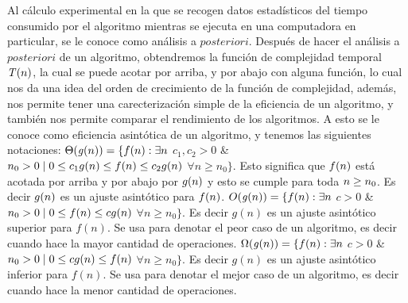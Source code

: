 \documentclass[12pt,twoside]{article}
\begin{document}
\newline
\newline
Al c\'alculo experimental en la que se recogen datos estad\'isticos del tiempo consumido por el algoritmo mientras se ejecuta en una computadora en particular, se le conoce como an\'alisis a $\mathit{posteriori}$.
\newline
\newline
Despu\'es de hacer el an\'alisis a $\mathit{posteriori}$ de un algoritmo, obtendremos la funci\'on de complejidad temporal $\mathit{T}(\mathnormal{n})$, la cual se puede acotar por arriba, y por abajo con alguna funci\'on, lo cual nos da una idea del orden de crecimiento de la funci\'on de complejidad, adem\'as, nos permite tener una carecterizaci\'on simple de la eficiencia de un algoritmo, y tambi\'en nos permite comparar el rendimiento de los algoritmos. A esto se le conoce como eficiencia asint\'otica de un algoritmo, y tenemos las siguientes notaciones:
\newline
$\Theta(\mathit{g}(\mathnormal{n})) = \{ \mathnormal{f}(\mathnormal{n}) : \exists \mathnormal{n}$  $c_1,c_2 > 0 $ \& $ n_0>0 \mid 0 \le c_1\mathnormal{g}(\mathnormal{n}) \le \mathnormal{f}(\mathnormal{n}) \le c_2 \mathnormal{g}(\mathnormal{n})$ $ \forall n \ge n_0 \}$. Esto significa que $ \mathnormal{f}(\mathnormal{n})$ est\'a acotada por arriba y por abajo por $\mathnormal{g}(\mathnormal{n})$ y esto se cumple para toda $\mathnormal{n} \ge n_0$. Es decir $\mathnormal{g}(\mathnormal{n})$ es un ajuste asint\'otico para $\mathnormal{f}(\mathnormal{n})$.
\newline
\newline
$O(\mathit{g}(\mathnormal{n})) = \{ \mathnormal{f}(\mathnormal{n}) : \exists \mathnormal{n}$  $c > 0 $ \& $ n_0>0 \mid 0 \le \mathnormal{f}(\mathnormal{n}) \le c \mathnormal{g}(\mathnormal{n})$ $ \forall n \ge n_0 \}$. Es decir $g(n)$ es un ajuste asint\'otico superior para $f(n)$. Se usa para denotar el peor caso de un algoritmo, es decir cuando hace la mayor cantidad de operaciones.
\newline
\newline
$\Omega(\mathit{g}(\mathnormal{n})) = \{ \mathnormal{f}(\mathnormal{n}) : \exists \mathnormal{n}$  $c > 0 $ \& $ n_0>0 \mid 0 \le c \mathnormal{g}(\mathnormal{n}) \le \mathnormal{f}(\mathnormal{n}) $ $ \forall n \ge n_0 \}$. Es decir $g(n)$ es un ajuste asint\'otico inferior para $f(n)$. Se usa para denotar el mejor caso de un algoritmo, es decir cuando hace la menor cantidad de operaciones.
\newline
\end{document}
